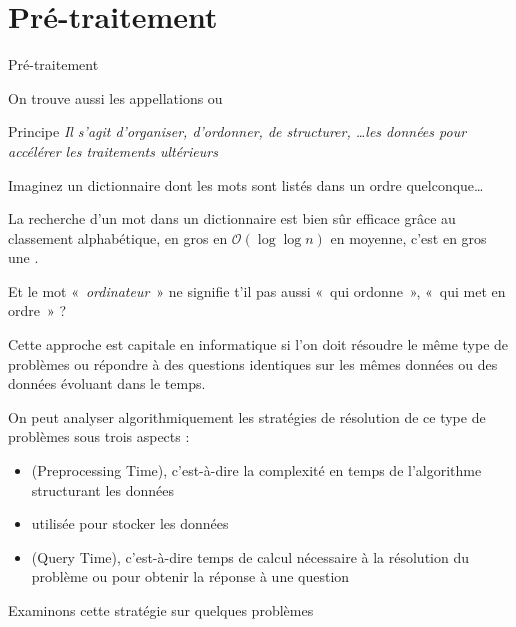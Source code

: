\documentclass[aspectratio=1610,francais,envcountsect]{beamer}
\begin{document}
\section{Pré-traitement}

\begin{frame}[allowframebreaks]{Pré-traitement}

  On trouve aussi les appellations  ou

  \begin{alertblock}{Principe}
    \it Il s’agit d’organiser, d’ordonner, de structurer, \ldots les
    données pour accélérer les traitements ultérieurs
  \end{alertblock}
  
  \begin{example}
    Imaginez un dictionnaire dont les mots sont listés dans un ordre
    quelconque\ldots
    
    La recherche d’un mot dans un dictionnaire est bien sûr efficace
    grâce au classement alphabétique, en gros en
    $\mathcal{O}(\log\log n)$ en moyenne, c’est en gros une
    .
    
    Et le mot «~\emph{ordinateur}~» ne signifie t’il pas aussi «~qui
    ordonne~», «~qui met en ordre~» ?
  \end{example}

  \framebreak

  Cette approche est capitale en informatique si l’on doit résoudre le
  même type de problèmes ou répondre à des questions identiques sur
  les mêmes données ou des données évoluant dans le temps.

  On peut analyser algorithmiquement les stratégies de résolution de
  ce type de problèmes sous trois aspects :
  \begin{itemize}
  \item {} (Preprocessing Time),
    c’est-à-dire la complexité en temps de l’algorithme structurant
    les données
  \item {} utilisée pour
    stocker les données
  \item {} (Query Time), c'est-à-dire
    temps de calcul nécessaire à la résolution du problème ou pour
    obtenir la réponse à une question
  \end{itemize}

  Examinons cette stratégie sur quelques problèmes
  
\end{frame}
\end{document}
